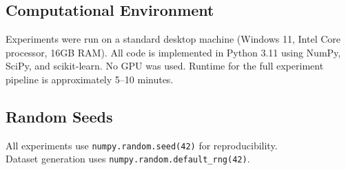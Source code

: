 \subsection{Computational Environment}

Experiments were run on a standard desktop machine (Windows 11,
Intel Core processor, 16GB RAM). All code is implemented in Python 3.11
using NumPy, SciPy, and scikit-learn. No GPU was used. Runtime for
the full experiment pipeline is approximately 5--10 minutes.

\subsection{Random Seeds}

\begin{flushleft}
All experiments use \texttt{numpy.random.seed(42)} for reproducibility. \\
Dataset generation uses \texttt{numpy.random.default\_rng(42)}.
\end{flushleft}
